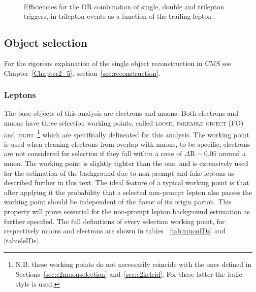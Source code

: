 \begin{figure}[h]
{  }\\
  \caption{Efficiencies for the OR combination of single, double and trilepton triggers, in trilepton events as a function
  of the trailing lepton \pt.}
  \label{fig:3l1l1lEff}
\end{figure}
\fi

\subsection{Object selection}\label{sec:object}
For the rigorous explanation of the single object reconstruction in
CMS see Chapter~\ref{Chapter2_5}, section~\ref{sec:reconstruction}.

\subsubsection{Leptons}
The base objects of this analysis are electrons and muons. Both
electrons and muons have three selection working points, called
\textsc{loose}, \textsc{fakeable object} (\textsc{FO}) and \textsc{tight}~\footnote{
N.B. these working points do not necessarily coincide with the ones
defined in Sections~\ref{sec:c2muonselection}
and~\ref{sec:c2keleid}. For these latter the italic style is used.} which
are specifically delineated for this analysis. The \lo working point
is used when cleaning electrons from overlap with muons, to be
specific, electrons are not considered for selection if they fall
within a cone of $\Delta \mathrm{R} = 0.05$ around a \lo muon. The
\fo working point is slightly tighter than the \lo one, and is
extensively used for the estimation of the background due to
non-prompt and fake leptons as described further in this text. The
ideal feature of a typical \fo working point is that after applying it
the probability that a selected non-prompt lepton also passes the
\ti working point should be independent
 of the flavor of its origin parton.
 This property will prove essential for the non-prompt lepton background estimation as further specified. The full definitions of every selection working point, for respectively muons and electrons are shown in tables ~\ref{tab:muonIDs} and \ref{tab:eleIDs}.

